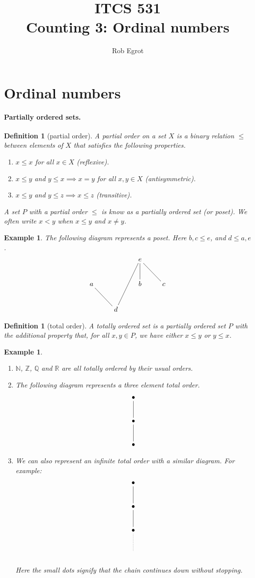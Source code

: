 \documentclass{article}
\title{ITCS 531 \\Counting 3: Ordinal numbers}
\author{Rob Egrot}
\date{}
\theoremstyle{plain}
\newtheorem{definition}[theorem]{Definition}{\bfseries}{\upshape}
\newtheorem{example}[theorem]{Example}{\bfseries}{\upshape}
\newcommand{\bN}{\mathbb{N}}
\newcommand{\bZ}{\mathbb{Z}}
\newcommand{\bQ}{\mathbb{Q}}
\newcommand{\bR}{\mathbb{R}}
\begin{document}
\maketitle

\section{Ordinal numbers}
\paragraph{Partially ordered sets.}
\begin{definition}[partial order]
A \emph{partial order} on  a set $X$ is a binary relation $\leq$ between elements of $X$ that satisfies the following properties.
\begin{enumerate}
\item $x\leq x$ for all $x\in X$ (reflexive). 
\item $x\leq y$ and $y\leq x\implies x=y$ for all $x,y\in X$ (antisymmetric).
\item $x\leq y$ and $y\leq z\implies x\leq z$ (transitive).
\end{enumerate}
A set $P$ with a partial order $\leq$ is know as a \emph{partially ordered set} (or \emph{poset}). We often write $x<y$ when $x\leq y$ and $x\neq y$.
\end{definition}

\begin{example}
The following diagram represents a poset. Here $b,c\leq e$, and $d\leq a,e$.
\[\xymatrix{& & e\ar@{-}[dr]\ar@{-}[d]\ar@{-}[ddl] \\
a\ar@{-}[rd] & & b & c \\
& d
}\] 
\end{example}


\begin{definition}[total order]
A \emph{totally ordered set} is a partially ordered set $P$ with the additional property that, for all $x,y\in P$, we have either $x\leq y$ or  $y\leq x$.
\end{definition}

\begin{example}\label{E:total}\mbox{}
\begin{enumerate}
\item $\bN$, $\bZ$, $\bQ$ and $\bR$ are all totally ordered by their usual orders.
\item The following diagram represents a three element total order.
\[\xymatrix{\bullet\ar@{-}[d] \\
\bullet\ar@{-}[d]  \\
\bullet 
}\] 

\item We can also represent an infinite total order with a similar diagram. For example: 
\[\xymatrix{\bullet\ar@{-}[d] \\
\bullet\ar@{-}[d]  \\
\bullet\ar@{..}[d] \\
\text{\phantom{x}}
}\] 

Here the small dots signify that the chain continues down without stopping.
\end{enumerate}
\end{example}
\end{document}
